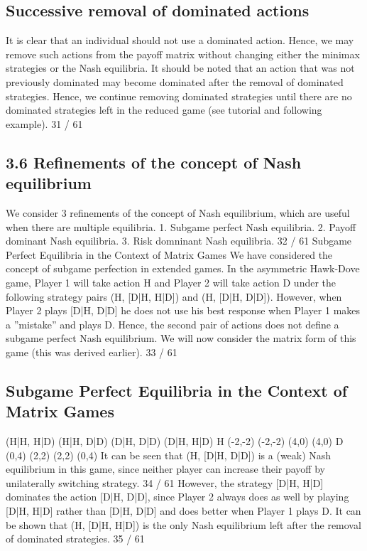 \documentclass[]{report}
\begin{document}
\subsection{Successive removal of dominated actions}
It is clear that an individual should not use a dominated action.
Hence, we may remove such actions from the payoff matrix without
changing either the minimax strategies or the Nash equilibria.
It should be noted that an action that was not previously
dominated may become dominated after the removal of dominated
strategies.
Hence, we continue removing dominated strategies until there are
no dominated strategies left in the reduced game (see tutorial and
following example).
31 / 61
\subsection{3.6 Refinements of the concept of Nash equilibrium}
We consider 3 refinements of the concept of Nash equilibrium,
which are useful when there are multiple equilibria.
1. Subgame perfect Nash equilibria.
2. Payoff dominant Nash equilibria.
3. Risk domninant Nash equilibria.
32 / 61
Subgame Perfect Equilibria in the Context of Matrix Games
We have considered the concept of subgame perfection in extended
games.
In the asymmetric Hawk-Dove game, Player 1 will take action H
and Player 2 will take action D under the following strategy pairs
(H, [D|H, H|D]) and (H, [D|H, D|D]).
However, when Player 2 plays [D|H, D|D] he does not use his best
response when Player 1 makes a ”mistake” and plays D. Hence,
the second pair of actions does not define a subgame perfect Nash
equilibrium.
We will now consider the matrix form of this game (this was
derived earlier).
33 / 61
\subsection{Subgame Perfect Equilibria in the Context of Matrix Games}
(H|H, H|D) (H|H, D|D) (D|H, D|D) (D|H, H|D)
H (-2,-2) (-2,-2) (4,0) (4,0)
D (0,4) (2,2) (2,2) (0,4)
It can be seen that (H, [D|H, D|D]) is a (weak) Nash equilibrium
in this game, since neither player can increase their payoff by
unilaterally switching strategy.
34 / 61
However, the strategy [D|H, H|D] dominates the action
[D|H, D|D], since Player 2 always does as well by playing
[D|H, H|D] rather than [D|H, D|D] and does better when Player 1
plays D.
It can be shown that (H, [D|H, H|D]) is the only Nash equilibrium
left after the removal of dominated strategies.
35 / 61
\end{document}
